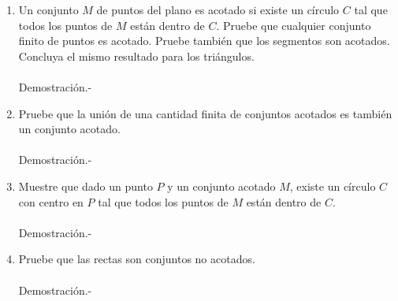 \documentclass[10pt]{article}
\begin{document}
\begin{enumerate}
	\item Un conjunto $M$ de puntos del plano es acotado si existe un círculo $C$ tal que todos los puntos de $M$ están dentro de $C$. Pruebe que cualquier conjunto finito de puntos es acotado. Pruebe también que los segmentos son acotados. Concluya el mismo resultado para los triángulos.\\\\
	Demostración.-\;

	\item Pruebe que la unión de una cantidad finita de conjuntos acotados es también un conjunto acotado.\\\\
	Demostración.-\;

	\item Muestre que dado un punto $P$ y un conjunto acotado $M$, existe un círculo $C$ con centro en $P$ tal que todos los puntos de $M$ están dentro de $C.$\\\\
	Demostración.-\;

	\item Pruebe que las rectas son conjuntos no acotados.\\\\
	Demostración.-\;



    \end{enumerate}
\end{document}
